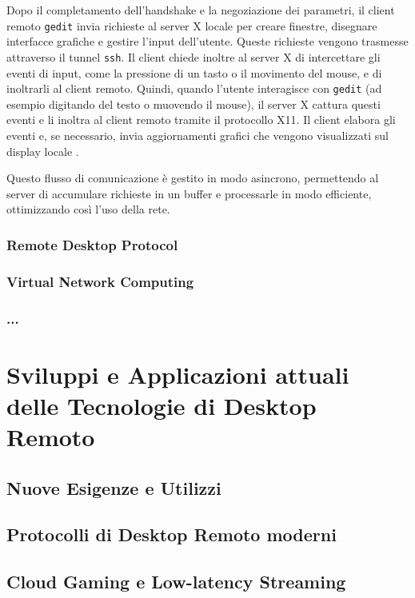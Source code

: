 \documentclass[12pt,a4paper,openright,twoside]{book}
\begin{document}
Dopo il completamento dell'handshake e la negoziazione dei parametri, il client remoto \texttt{gedit} invia richieste al server X locale per creare finestre, disegnare interfacce grafiche e gestire l'input dell'utente. Queste richieste vengono trasmesse attraverso il tunnel \texttt{ssh}. Il client chiede inoltre al server X di intercettare gli eventi di input, come la pressione di un tasto o il movimento del mouse, e di inoltrarli al client remoto. Quindi, quando l'utente interagisce con \texttt{gedit} (ad esempio digitando del testo o muovendo il mouse), il server X cattura questi eventi e li inoltra al client remoto tramite il protocollo X11. Il client elabora gli eventi e, se necessario, invia aggiornamenti grafici che vengono visualizzati sul display locale \cite{coopersmith2024x}.

Questo flusso di comunicazione è gestito in modo asincrono, permettendo al server di accumulare richieste in un buffer e processarle in modo efficiente, ottimizzando così l'uso della rete.


\subsection{Remote Desktop Protocol}

\subsection{Virtual Network Computing}

\subsection{...}

\chapter{Sviluppi e Applicazioni attuali delle Tecnologie di Desktop Remoto}

\section{Nuove Esigenze e Utilizzi}

\section{Protocolli di Desktop Remoto moderni}

\section{Cloud Gaming e Low-latency Streaming}
\end{document}

